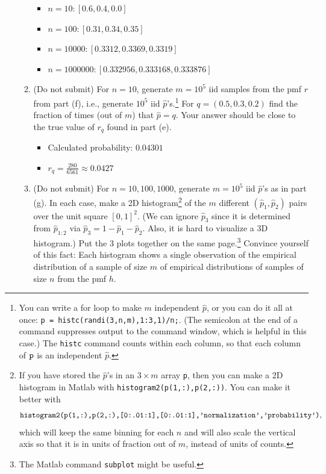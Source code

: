 \documentclass[12pt]{article}
\begin{document}
\begin{enumerate}[1.]
\begin{enumerate}
		            \color{blue}
		            \begin{itemize}
			            \item $n = 10: [0.6, 0.4, 0.0]$
			            \item $n = 100: [0.31, 0.34, 0.35]$
			            \item $n = 10000: [0.3312, 0.3369, 0.3319]$
			            \item $n = 1000000: [0.332956, 0.333168, 0.333876]$
		            \end{itemize}
		            \color{black}

		      \item {\color{blue} (Do not submit)} For $n=10$, generate $m=10^5$ iid samples from the pmf $r$ from part (f), i.e., generate $10^5$ iid $\widehat p$'s.\footnote{You can write a for loop to make $m$ independent $\widehat p$, or you can do it all at once: {\tt p = histc(randi(3,n,m),1:3,1)/n;}. (The semicolon at the end of a command suppresses output to the command window, which is helpful in this case.) The {\tt histc} command counts within each column, so that each column of ${\tt p}$ is an independent $\widehat p$. }  For $q=(0.5,0.3,0.2)$ find the fraction of times (out of $m$) that $\widehat p = q$. Your answer should be close to the true value of $r_q$ found in part (e).

		            \color{blue}
		            \begin{itemize}
			            \item Calculated probability: $0.04301$
			            \item $r_q = \frac{280}{6561} \approx 0.0427$
		            \end{itemize}
		            \color{black}

		      \item {\color{blue} (Do not submit)} For $n=10,100,1000$, generate $m=10^5$ iid $\widehat p$'s as in part (g). In each case, make a 2D histogram\footnote{If you have stored the $\widehat p$'s in an $3\times m$ array {\tt p}, then you can make a 2D histogram in Matlab with {\tt histogram2(p(1,:),p(2,:))}. You can make it better with \[ \text{\tt histogram2(p(1,:),p(2,:),[0:.01:1],[0:.01:1],'normalization','probability')}, \] which will keep the same binning for each $n$ and will also scale the vertical axis so that it is in units of fraction out of $m$, instead of units of counts.} of the $m$ different $(\widehat p_1,\widehat p_2)$ pairs over the unit square $[0,1]^2$. (We can ignore $\widehat p_3$ since it is determined from $\widehat p_{1:2}$ via $\widehat p_3=1-\widehat p_1-\widehat p_2$. Also, it is hard to visualize a 3D histogram.) Put the 3 plots together on the same page.\footnote{The Matlab command {\tt subplot} might be useful.} Convince yourself of this fact: Each histogram shows a single observation of the empirical distribution of a sample of size $m$ of empirical distributions of samples of size $n$ from the pmf $h$.


\end{enumerate}
\end{enumerate}
\end{document}
